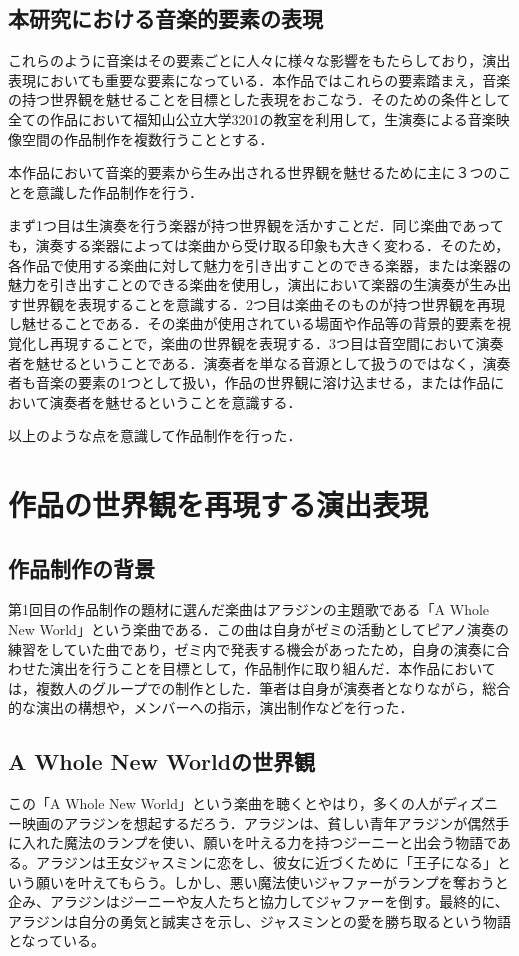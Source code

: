 \subsection{本研究における音楽的要素の表現}
これらのように音楽はその要素ごとに人々に様々な影響をもたらしており，演出表現においても重要な要素になっている．本作品ではこれらの要素踏まえ，音楽の持つ世界観を魅せることを目標とした表現をおこなう．そのための条件として全ての作品において福知山公立大学3201の教室を利用して，生演奏による音楽映像空間の作品制作を複数行うこととする．

本作品において音楽的要素から生み出される世界観を魅せるために主に３つのことを意識した作品制作を行う．

まず1つ目は生演奏を行う楽器が持つ世界観を活かすことだ．同じ楽曲であっても，演奏する楽器によっては楽曲から受け取る印象も大きく変わる．そのため，各作品で使用する楽曲に対して魅力を引き出すことのできる楽器，または楽器の魅力を引き出すことのできる楽曲を使用し，演出において楽器の生演奏が生み出す世界観を表現することを意識する．2つ目は楽曲そのものが持つ世界観を再現し魅せることである．その楽曲が使用されている場面や作品等の背景的要素を視覚化し再現することで，楽曲の世界観を表現する．3つ目は音空間において演奏者を魅せるということである．演奏者を単なる音源として扱うのではなく，演奏者も音楽の要素の1つとして扱い，作品の世界観に溶け込ませる，または作品において演奏者を魅せるということを意識する．

以上のような点を意識して作品制作を行った．




\section{作品の世界観を再現する演出表現}
\subsection{作品制作の背景}
第1回目の作品制作の題材に選んだ楽曲はアラジンの主題歌である「A Whole New World」\cite{Aladdin}という楽曲である．この曲は自身がゼミの活動としてピアノ演奏の練習をしていた曲であり，ゼミ内で発表する機会があったため，自身の演奏に合わせた演出を行うことを目標として，作品制作に取り組んだ．本作品においては，複数人のグループでの制作とした．筆者は自身が演奏者となりながら，総合的な演出の構想や，メンバーへの指示，演出制作などを行った．


\subsection{A Whole New Worldの世界観}
この「A Whole New World」という楽曲を聴くとやはり，多くの人がディズニー映画のアラジンを想起するだろう．アラジンは、貧しい青年アラジンが偶然手に入れた魔法のランプを使い、願いを叶える力を持つジーニーと出会う物語である。アラジンは王女ジャスミンに恋をし、彼女に近づくために「王子になる」という願いを叶えてもらう。しかし、悪い魔法使いジャファーがランプを奪おうと企み、アラジンはジーニーや友人たちと協力してジャファーを倒す。最終的に、アラジンは自分の勇気と誠実さを示し、ジャスミンとの愛を勝ち取るという物語となっている。

